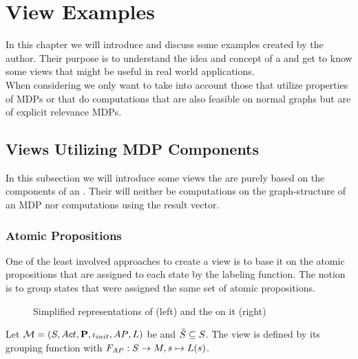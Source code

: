 \documentclass[preview]{standalone}
\begin{document}
\section{View Examples}
In this chapter we will introduce and discuss some \viewN examples created by the author. Their purpose is to understand the idea and concept of a \viewN and get to know some views that might be useful in real world applications. \\
When considering \viewsN we only want to take into account those that utilize properties of MDPs or that do computations that are also feasible on normal graphs but are of explicit relevance MDPs.
\subsection{Views Utilizing MDP Components}
In this subsection we will introduce some views the are purely based on the components of an \mdpN. Their will neither be computations on the graph-structure of an MDP nor computations using the result vector.
\subsubsection{Atomic Propositions}
One of the least involved approaches to create a view is to base it on the atomic propositions that are assigned to each state by the labeling function. The notion is to group states that were assigned the same set of atomic propositions. 


\begin{figure}[h]
	\begin{minipage}{.6\textwidth}
		
	\end{minipage}%
	\begin{minipage}{.5\textwidth}
		
	\end{minipage}
	\caption{Simplified representations of \mdp (left) and the \viewN \viewatomicprops on it (right)}
	\label{fig:apHasBeforeAfter}  
\end{figure}


\begin{definition}	
	Let ${{{\mathcal{M}}}} = {{({S}, {Act}, {\textbf{P}}, {\iota_{init}}, {AP}, {L})}}$ be \achgphN and ${\tilde{{S}}} \subseteq {S}$. The view \viewatomicprops is defined by its grouping function \gfctatomicprops \grpfctN with $\gfctatomicprops : \states \to \imggrp, {\state}\mapsto{\labelingfct(\state)}$.
\end{definition}
\end{document}
